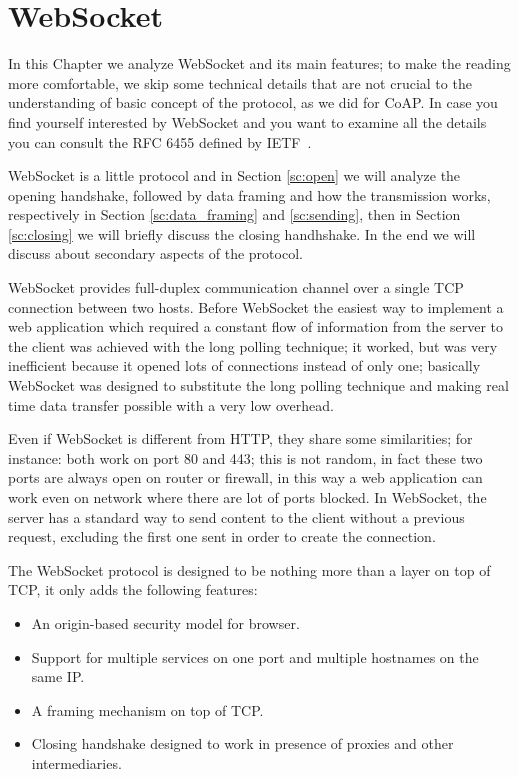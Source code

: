 \chapter{WebSocket}\label{ch:ws}
In this Chapter we analyze WebSocket and its main features; to make the reading more comfortable,
we skip some technical details that are not crucial to the understanding of basic concept of the protocol, as we did for CoAP.\newline
In case you find yourself interested by WebSocket and you want to examine all the details you can consult the RFC 6455 defined by IETF~\cite{rfcws}. \newline

WebSocket is a little protocol and in Section \ref{sc:open} we will analyze the opening handshake, followed by data framing and how the transmission works, respectively in Section \ref{sc:data_framing} and \ref{sc:sending}, then in Section \ref{sc:closing} we will briefly discuss the closing handhshake.\newline
In the end we will discuss about secondary aspects of the protocol.\newline

WebSocket provides full-duplex communication channel over a single TCP connection between two hosts.\newline
Before WebSocket the easiest way to implement a web application which required a constant flow of information from
the server to the client was achieved with the long polling technique; it worked, but was very inefficient because it opened
lots of connections instead of only one; basically WebSocket was designed to substitute the long polling technique and making real time data transfer 
possible with a very low overhead.\newline

Even if WebSocket is different from HTTP, they share some similarities; for instance: both work on port 80 and 443; this is not random, in fact these two ports
are always open on router or firewall, in this way a web application can work even on network where there are lot of ports blocked.\newline
In WebSocket, the server has a standard way to send content to the client without a previous request, excluding the first one sent in order to create the connection.\newline

The WebSocket protocol is designed to be nothing more than a layer on top of TCP, it only adds the following features:
\begin{itemize}
	\item An origin-based security model for browser.
	\item Support for multiple services on one port and multiple hostnames on the same IP.
	\item A framing mechanism on top of TCP.
	\item Closing handshake designed to work in presence of proxies and other intermediaries.
\end{itemize}

